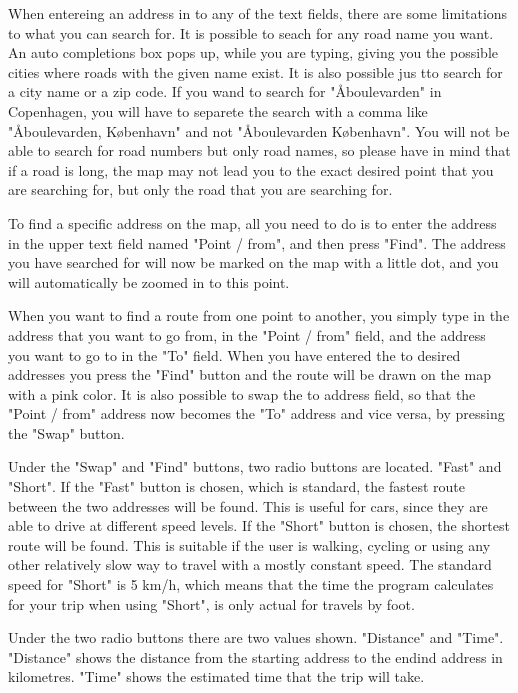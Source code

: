 When entereing an address in to any of the text fields, there are some limitations to what you can search for. It is possible to seach for any road name you want. An auto completions box pops up, while you are typing, giving you the possible cities where roads with the given name exist. It is also possible jus tto search for a city name or a zip code. If you wand to search for "Åboulevarden" in Copenhagen, you will have to separete the search with a comma like "Åboulevarden, København" and not "Åboulevarden København". You will not be able to search for road numbers but only road names, so please have in mind that if a road is long, the map may not lead you to the exact desired point that you are searching for, but only the road that you are searching for.

To find a specific address on the map, all you need to do is to enter the address in the upper text field named "Point / from", and then press "Find". The address you have searched for will now be marked on the map with a little dot, and you will automatically be zoomed in to this point.

When you want to find a route from one point to another, you simply type in the address that you want to go from, in the "Point / from" field, and the address you want to go to in the "To" field. When you have entered the to desired addresses you press the "Find" button and the route will be drawn on the map with a pink color. 
It is also possible to swap the to address field, so that the "Point / from" address now becomes the "To" address and vice versa, by pressing the "Swap" button.

Under the "Swap" and "Find" buttons, two radio buttons are located. "Fast" and "Short". If the "Fast" button is chosen, which is standard, the fastest route between the two addresses will be found. This is useful for cars, since they are able to drive at different speed levels. If the "Short" button is chosen, the shortest route will be found. This is suitable if the user is walking, cycling or using any other relatively slow way to travel with a mostly constant speed. The standard speed for "Short" is 5 km/h, which means that the time the program calculates for your trip when using "Short", is only actual for travels by foot.

Under the two radio buttons there are two values shown. "Distance" and "Time". "Distance" shows the distance from the starting address to the endind address in kilometres. "Time" shows the estimated time that the trip will take. 

